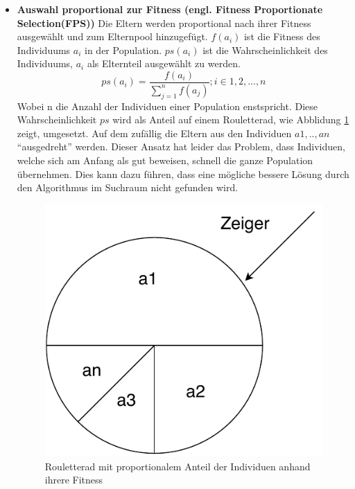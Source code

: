 \begin{itemize}
\item \textbf{Auswahl proportional zur Fitness (engl. Fitness Proportionate Selection(FPS))} Die Eltern werden proportional nach ihrer Fitness ausgewählt und zum Elternpool hinzugefügt. $f(a_i)$ ist die Fitness des Individuums $a_i$ in der Population. $ps(a_i)$ ist die Wahrscheinlichkeit des Individuums, $a_i$ als Elternteil ausgewählt zu werden.
\begin{equation}
	ps(a_i) = \frac{f(a_i)}{\sum_{j=1}^n f(a_j)}; i\in{1,2,...,n} \label{eq:7}
\end{equation}
Wobei n die Anzahl der Individuen einer Population enstspricht.
Diese Wahrscheinlichkeit $ps$ wird als Anteil auf einem Rouletterad, wie Abblidung \ref{fig:roulette_wheel} zeigt, umgesetzt. Auf dem zufällig die Eltern aus den Individuen $a1,..,an$  "`ausgedreht"' werden. Dieser Ansatz hat leider das Problem, dass Individuen, welche sich am Anfang als gut beweisen, schnell die ganze Population übernehmen. Dies kann dazu führen, dass eine mögliche bessere Lösung durch den Algorithmus im Suchraum nicht gefunden wird.

\begin{figure}[htb]
  \centering  
  \includegraphics[scale=0.7]{img/roulette_wheel.pdf}
  \caption{Rouletterad mit proportionalem Anteil der Individuen anhand ihrere Fitness}
  \label{fig:roulette_wheel}
\end{figure}



\end{itemize}

